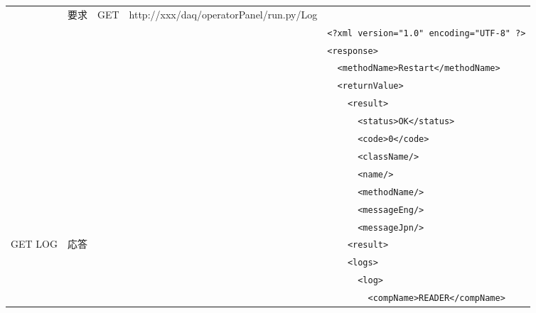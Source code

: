 \documentclass[a4j,10pt,dvips,onecolumn,oneside,final]{jarticle}%
\begin{document}
\begin{table}[htbp]
\begin{center}
{\begin{tabular}{|l|c|c|l|l|}
                  & 要求      & GET  & http://xxx/daq/operatorPanel/run.py/Log    & \\ \cline{2-5}
                  &           &      &                                            & \verb|<?xml version="1.0" encoding="UTF-8" ?>|\\
                  &           &      &                                            & \verb|<response>|\\ 
                  &           &      &                                            & \verb|  <methodName>Restart</methodName>|\\ 
                  &           &      &                                            & \verb|  <returnValue>|\\ 
                  &           &      &                                            & \verb|    <result>|\\ 
                  &           &      &                                            & \verb|      <status>OK</status>|\\ 
                  &           &      &                                            & \verb|      <code>0</code>|\\ 
                  &           &      &                                            & \verb|      <className/>|\\ 
                  &           &      &                                            & \verb|      <name/>|\\ 
                  &           &      &                                            & \verb|      <methodName/>|\\ 
                  &           &      &                                            & \verb|      <messageEng/>|\\ 
                  &           &      &                                            & \verb|      <messageJpn/>|\\ 
    GET LOG       & 応答      &      &                                            & \verb|    <result>|\\
                  &           &      &                                            & \verb|    <logs>|\\
                  &           &      &                                            & \verb|      <log>|\\
                  &           &      &                                            & \verb|        <compName>READER</compName>|\\

\end{tabular}}
\end{center}
\end{table}
\end{document}
